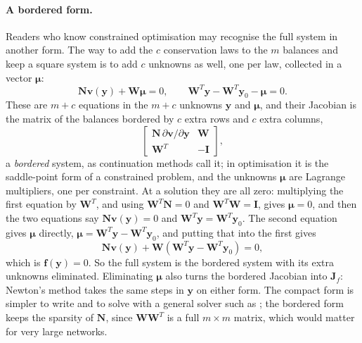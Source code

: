 \documentclass[11pt,a4paper,openany]{report}
\begin{document}
{{\paragraph{A bordered form.} Readers who know constrained optimisation may
recognise the full system in another form. The way to add the $c$ conservation
laws to the $m$ balances and keep a square system is to add $c$ unknowns as
well, one per law, collected in a vector $\boldsymbol{\mu}$:
\[
  \mathbf{N} \mathbf{v}(\mathbf{y}) + \mathbf{W} \boldsymbol{\mu} = 0 ,
  \qquad
  \mathbf{W}^T \mathbf{y} - \mathbf{W}^T \mathbf{y}_0 - \boldsymbol{\mu} = 0 .
\]
These are $m + c$ equations in the $m + c$ unknowns $\mathbf{y}$ and
$\boldsymbol{\mu}$, and their Jacobian is the matrix of the balances bordered
by $c$ extra rows and $c$ extra columns,
\[
  \begin{bmatrix}
    \mathbf{N}\, \partial \mathbf{v} / \partial \mathbf{y} & \mathbf{W} \\
    \mathbf{W}^T & -\mathbf{I}
  \end{bmatrix} ,
\]
a \emph{bordered} system, as continuation methods call it; in
optimisation it is the saddle-point form of a constrained problem, and the
unknowns $\boldsymbol{\mu}$ are Lagrange multipliers, one per
constraint. At a solution they are all zero: multiplying the first equation
by $\mathbf{W}^T$, and using $\mathbf{W}^T \mathbf{N} = 0$ and
$\mathbf{W}^T \mathbf{W} = \mathbf{I}$, gives $\boldsymbol{\mu} = 0$, and
then the two equations say $\mathbf{N} \mathbf{v}(\mathbf{y}) = 0$ and
$\mathbf{W}^T \mathbf{y} = \mathbf{W}^T \mathbf{y}_0$. The second equation
gives $\boldsymbol{\mu}$ directly, $\boldsymbol{\mu} = \mathbf{W}^T
\mathbf{y} - \mathbf{W}^T \mathbf{y}_0$, and putting that into the first
gives
\[
  \mathbf{N} \mathbf{v}(\mathbf{y}) + \mathbf{W} (\mathbf{W}^T \mathbf{y} -
  \mathbf{W}^T \mathbf{y}_0) = 0 ,
\]
which is $\mathbf{f}(\mathbf{y}) = 0$. So the full system is the bordered
system with its extra unknowns eliminated.
Eliminating $\boldsymbol{\mu}$ also turns the bordered Jacobian into
$\mathbf{J}_f$: Newton's method takes the same steps in $\mathbf{y}$ on
either form. The compact form is simpler to write and to solve with a
general solver such as ; the bordered form keeps the
sparsity of $\mathbf{N}$, since $\mathbf{W}\mathbf{W}^T$ is a full
$m \times m$ matrix, which would matter for very large networks.

}}
\end{document}
